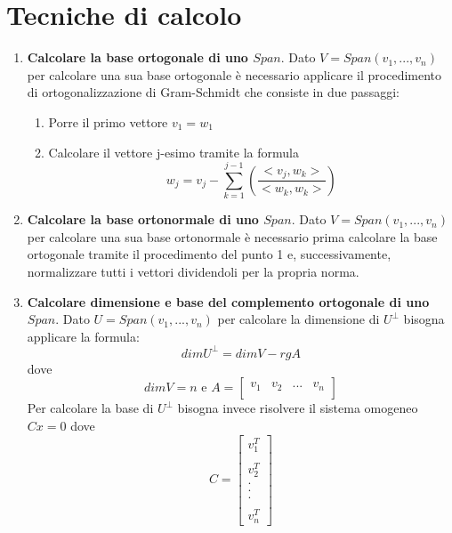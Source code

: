 \documentclass[12pt,a4paper,oneside]{book}
\begin{document}
\newpage
			  \section{Tecniche di calcolo}
			  
\begin{enumerate}

\item \textbf{Calcolare la base ortogonale di uno $Span$}. \linebreak
	  Dato $V = Span(v_1, ..., v_n)$ per calcolare una sua base ortogonale è necessario applicare il 
	  procedimento di ortogonalizzazione di Gram-Schmidt che consiste in due passaggi:
	 
	  \begin{enumerate}
	  \item Porre il primo vettore $v_1 = w_1$
	  \item Calcolare il vettore j-esimo tramite la formula
		    $$w_j = v_j - \sum_{k=1}^{j-1}\left(\frac{<v_j, w_k>}{<w_k, w_k>}\right) $$
	  \end{enumerate}

\item \textbf{Calcolare la base ortonormale di uno $Span$}. \linebreak
	  Dato $V = Span(v_1, ..., v_n)$ per calcolare una sua base ortonormale è necessario prima calcolare la
	  base ortogonale tramite il procedimento del punto 1 e, successivamente, normalizzare tutti i vettori
	  dividendoli per la propria norma.
	
\item \textbf{Calcolare dimensione e base del complemento ortogonale di uno $Span$}. \linebreak
	  Dato $U = Span(v_1, ..., v_n)$ per calcolare la dimensione di $U^{\perp}$ bisogna applicare la 
	  formula: $$dimU^{\perp} = dimV - rgA$$
	  dove $$dimV = n \text{ e } A=\begin{bmatrix}
	  v_1 & v_2 & ... & v_n\\
	  \end{bmatrix}$$
	  Per calcolare la base di $U^{\perp}$ bisogna invece risolvere il sistema omogeneo $Cx=0$ dove
	  $$C = \begin{bmatrix}
	  v_1^T \\ \\ v_2^T \\ . \\ . \\ . \\  \\ v_n^T
	  \end{bmatrix}$$
	 

\end{enumerate}
\end{document}
